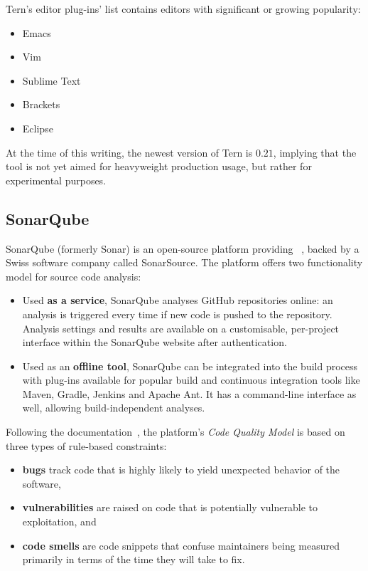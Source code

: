 Tern's editor plug-ins' list contains editors with significant or growing popularity:

\begin{itemize}
\item Emacs
\item Vim
\item Sublime Text
\item Brackets
\item Eclipse
\end{itemize}

At the time of this writing, the newest version of Tern is $0.21$, implying that the tool is not yet aimed for heavyweight production usage, but rather for experimental purposes.


\subsection{SonarQube}

SonarQube (formerly Sonar) is an open-source platform providing ~\cite{sonarqube-website}, backed by a Swiss software company called SonarSource. The platform offers two functionality model for source code analysis:

\begin{itemize}
\item Used \textbf{as a service}, SonarQube analyses GitHub repositories online: an analysis is triggered every time if new code is pushed to the repository. Analysis settings and results are available on a customisable, per-project interface within the SonarQube website after authentication.
\item Used as an \textbf{offline tool}, SonarQube can be integrated into the build process with plug-ins available for popular build and continuous integration tools like Maven, Gradle, Jenkins and Apache Ant. It has a command-line interface as well, allowing build-independent analyses.
\end{itemize}

Following the documentation~\cite{sonarqube-website}, the platform's \emph{Code Quality Model} is based on three types of rule-based constraints:

\begin{itemize}
\item \textbf{bugs} track code that is highly likely to yield unexpected behavior of the software,
\item \textbf{vulnerabilities} are raised on code that is potentially vulnerable to exploitation, and
\item \textbf{code smells} are code snippets that confuse maintainers being measured primarily in terms of the time they will take to fix.
\end{itemize}

